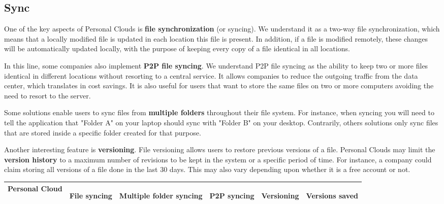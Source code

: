 {\subsection{Sync}
One of the key aspects of Personal Clouds is \textbf{file synchronization} (or syncing). We understand it as a two-way file synchronization, which means that a locally modified file is updated in each location this file is present. In addition, if a file is modified remotely, these changes will be automatically updated locally, with the purpose of keeping every copy of a file identical in all locations.

In this line, some companies also implement \textbf{P2P file syncing}. We understand P2P file syncing as the ability to keep two or more files identical in different locations without resorting to a central service. It allows companies to reduce the outgoing traffic from the data center, which translates in cost savings. It is also useful for users that want to store the same files on two or more computers avoiding the need to resort to the server.

Some solutions enable users to sync files from \textbf{multiple folders} throughout their file system. For instance, when syncing you will need to tell the application that "Folder A" on your laptop should sync with "Folder B" on your desktop. Contrarily, others solutions only sync files that are stored inside a specific folder created for that purpose.

Another interesting feature is \textbf{versioning}. File versioning allows users to restore previous versions of a file. Personal Clouds may limit the \textbf{version history} to a maximum number of revisions to be kept in the system or a specific period of time. For instance, a company could claim storing all versions of a file done in the last 30 days. This may also vary depending upon whether it is a free account or not.


{
\def\arraystretch{1.5}

\begin{table}
\begin{center}
    \begin{tabular}{ | p{3.3cm} | p{1.4cm} | p{1.4cm} | p{2.4cm} | p{1.4cm} | p{2.9cm} | }
    \hline
    \rowcolor[gray]{0.8}

	\textbf{Personal Cloud} &
	\begin{sideways}\textbf{File syncing}\end{sideways} &
	\begin{sideways}\textbf{Multiple folder syncing}\end{sideways} &
	\begin{sideways}\textbf{P2P syncing}\end{sideways} & 
	\begin{sideways}\textbf{Versioning}\end{sideways} & 
	\begin{sideways}\textbf{Versions saved}\end{sideways} \\ \hline


\end{tabular}
\end{center}
\end{table}}}
